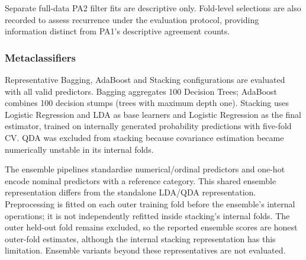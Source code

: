 Separate full-data PA2 filter fits are descriptive only. Fold-level selections are also recorded to assess recurrence under the evaluation protocol, providing information distinct from PA1's descriptive agreement counts.

\subsubsection{Metaclassifiers}
Representative Bagging, AdaBoost and Stacking configurations are evaluated with all valid predictors. Bagging aggregates 100 Decision Trees; AdaBoost combines 100 decision stumps (trees with maximum depth one). Stacking uses Logistic Regression and LDA as base learners and Logistic Regression as the final estimator, trained on internally generated probability predictions with five-fold CV. QDA was excluded from stacking because covariance estimation became numerically unstable in its internal folds.

The ensemble pipelines standardise numerical/ordinal predictors and one-hot encode nominal predictors with a reference category. This shared ensemble representation differs from the standalone LDA/QDA representation. Preprocessing is fitted on each outer training fold before the ensemble's internal operations; it is not independently refitted inside stacking's internal folds. The outer held-out fold remains excluded, so the reported ensemble scores are honest outer-fold estimates, although the internal stacking representation has this limitation. Ensemble variants beyond these representatives are not evaluated.
